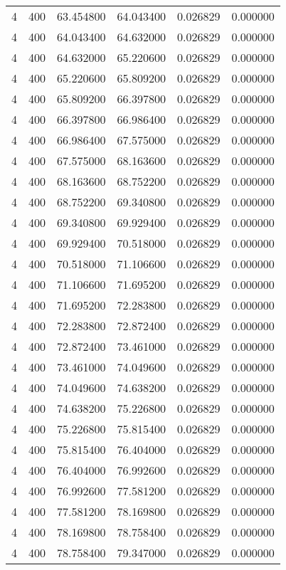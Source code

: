 \begin{longtable}{rrrrrr}
4 & 400 & 63.454800 & 64.043400 & 0.026829 & 0.000000 \\
4 & 400 & 64.043400 & 64.632000 & 0.026829 & 0.000000 \\
4 & 400 & 64.632000 & 65.220600 & 0.026829 & 0.000000 \\
4 & 400 & 65.220600 & 65.809200 & 0.026829 & 0.000000 \\
4 & 400 & 65.809200 & 66.397800 & 0.026829 & 0.000000 \\
4 & 400 & 66.397800 & 66.986400 & 0.026829 & 0.000000 \\
4 & 400 & 66.986400 & 67.575000 & 0.026829 & 0.000000 \\
4 & 400 & 67.575000 & 68.163600 & 0.026829 & 0.000000 \\
4 & 400 & 68.163600 & 68.752200 & 0.026829 & 0.000000 \\
4 & 400 & 68.752200 & 69.340800 & 0.026829 & 0.000000 \\
4 & 400 & 69.340800 & 69.929400 & 0.026829 & 0.000000 \\
4 & 400 & 69.929400 & 70.518000 & 0.026829 & 0.000000 \\
4 & 400 & 70.518000 & 71.106600 & 0.026829 & 0.000000 \\
4 & 400 & 71.106600 & 71.695200 & 0.026829 & 0.000000 \\
4 & 400 & 71.695200 & 72.283800 & 0.026829 & 0.000000 \\
4 & 400 & 72.283800 & 72.872400 & 0.026829 & 0.000000 \\
4 & 400 & 72.872400 & 73.461000 & 0.026829 & 0.000000 \\
4 & 400 & 73.461000 & 74.049600 & 0.026829 & 0.000000 \\
4 & 400 & 74.049600 & 74.638200 & 0.026829 & 0.000000 \\
4 & 400 & 74.638200 & 75.226800 & 0.026829 & 0.000000 \\
4 & 400 & 75.226800 & 75.815400 & 0.026829 & 0.000000 \\
4 & 400 & 75.815400 & 76.404000 & 0.026829 & 0.000000 \\
4 & 400 & 76.404000 & 76.992600 & 0.026829 & 0.000000 \\
4 & 400 & 76.992600 & 77.581200 & 0.026829 & 0.000000 \\
4 & 400 & 77.581200 & 78.169800 & 0.026829 & 0.000000 \\
4 & 400 & 78.169800 & 78.758400 & 0.026829 & 0.000000 \\
4 & 400 & 78.758400 & 79.347000 & 0.026829 & 0.000000 \\

\end{longtable}
